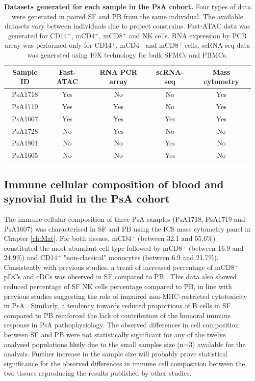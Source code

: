 \begin{table}[htbp]
\centering
\begin{tabular}{@{} c c c c c}
\toprule
\textbf{Sample ID} & \textbf{Fast-ATAC} & \textbf{RNA PCR array} & \textbf{scRNA-seq} & \textbf{Mass cytometry} \\
\midrule
\midrule
PsA1718 & Yes & No & No & Yes\\
PsA1719 & Yes & Yes & No & Yes\\
PsA1607 & Yes & Yes & Yes & Yes\\
PsA1728 & No & Yes & No & No\\
PsA1801 & No & No & Yes & No\\
PsA1605 & No & No & Yes & No\\
\bottomrule
\end{tabular}
\medskip %
\caption[Datasets generated for each sample in the PsA cohort.]{\textbf{Datasets generated for each sample in the PsA cohort.} Four types of data were generated in paired SF and PB from the same individual. The available datasets vary between individuals due to project constrains. Fast-ATAC data was generated for CD14$^+$, mCD4$^+$, mCD8$^+$ and NK cells. RNA expression by PCR array was performed only for CD14$^+$, mCD4$^+$ and mCD8$^+$ cells. scRNA-seq data was generated using 10X technology for bulk SFMCs and PBMCs.}
\label{tab:PSA_datasets_per_sample}
\end{table}
\bigskip %

\subsection{Immune cellular composition of blood and synovial fluid in the PsA cohort}
The immune cellular composition of three PsA samples (PsA1718, PsA1719 and PsA1607) was characterised in SF and PB using the ICS mass cytometry panel in Chapter \ref{ch:Mat}. For both tissues, mCD4$^+$ (between 32.1 and 55.6\%) constituted the most abundant cell type followed by mCD8$^+$ (between 16.9 and 24.9\%) and CD14$^+$ "non-classical" monocytes (between 6.9 and 21.7\%). Consistently with previous studies, a trend of increased percentage of mCD8$^+$ pDCs and cDCs was observed in SF compared to PB \parencite{Ross2000,Jongbloed2006}. This data also showed reduced percentage of SF NK cells percentage compared to PB, in line with previous studies suggesting the role of impaired non-MHC-restricted cytotoxicity in PsA \parencite{Spadaro2004}. Similarly, a tendency towards reduced proportions of B cells in SF compared to PB reinforced the lack of contribution of the humoral immune response in PsA pathophysiology. The observed differences in cell composition between SF and PB were not statistically significant for any of the twelve analysed populations likely due to the small samples size (n=3) available for the analysis. Further increase in the sample size will probably prove statistical significance for the observed differences in immune cell composition between the two tissues reproducing the results published by other studies.   


